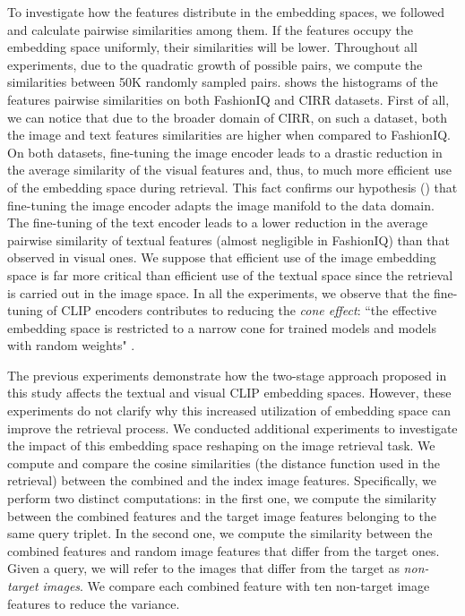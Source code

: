 \documentclass[acmlarge]{acmart}
\begin{document}
To investigate how the features distribute in the embedding spaces, we followed \cite{liang2022mind} and calculate pairwise similarities among them. If the features occupy the embedding space uniformly, their similarities will be lower. Throughout all experiments, due to the quadratic growth of possible pairs, we compute the similarities between 50K randomly sampled pairs.
 shows the histograms of the features pairwise similarities on both FashionIQ and CIRR datasets.
First of all, we can notice that due to the broader domain of CIRR, on such a dataset, both the image and text features similarities are higher when compared to FashionIQ.
On both datasets, fine-tuning the image encoder leads to a drastic reduction in the average similarity of the visual features and, thus, to much more efficient use of the embedding space during retrieval.
This fact confirms our hypothesis () that fine-tuning the image encoder adapts the image manifold to the data domain.
The fine-tuning of the text encoder leads to a lower reduction in the average pairwise similarity of textual features (almost negligible in FashionIQ) than that observed in visual ones. 
We suppose that efficient use of the image embedding space is far more critical than efficient use of the textual space since the retrieval is carried out in the image space.
In all the experiments, we observe that the fine-tuning of CLIP encoders contributes to reducing the \textit{cone effect}: ``the effective embedding space is restricted to a narrow cone for trained models and models with random weights" \cite{liang2022mind}.

The previous experiments demonstrate how the two-stage approach proposed in this study affects the textual and visual CLIP embedding spaces. However, these experiments do not clarify why this increased utilization of embedding space can improve the retrieval process. We conducted additional experiments to investigate the impact of this embedding space reshaping on the image retrieval task.
We compute and compare the cosine similarities (the distance function used in the retrieval) between the combined and the index image features. Specifically, we perform two distinct computations: in the first one, we compute the similarity between the combined features and the target image features belonging to the same query triplet. In the second one, we compute the similarity between the combined features and random image features that differ from the target ones. Given a query, we will refer to the images that differ from the target as \textit{non-target images}. We compare each combined feature with ten non-target image features to reduce the variance.
\end{document}
